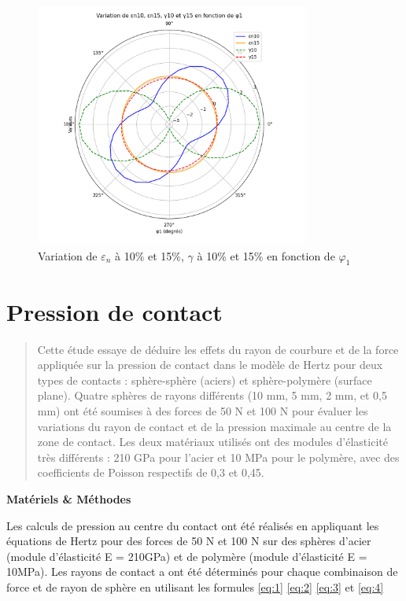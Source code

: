 \documentclass[a4paper,12pt]{article}
\begin{document}
\begin{figure}[H] 
	\centering
	\includegraphics[width=0.8\textwidth]{biop.png} 
	\caption{Variation de $\varepsilon_n$ à 10\% et 15\%, $\gamma$ à 10\% et 15\% en fonction de $\varphi_1$} 
	\label{fig:mon_image13} 
\end{figure}

\section{Pression de contact}

\begin{abstract}
	Cette étude essaye de déduire les effets du rayon de courbure et de la force appliquée sur la pression de contact dans le modèle de Hertz pour deux types de contacts : sphère-sphère (aciers) et sphère-polymère (surface plane). Quatre sphères de rayons différents (10 mm, 5 mm, 2 mm, et 0,5 mm) ont été soumises à des forces de 50 N et 100 N pour évaluer les variations du rayon de contact et de la pression maximale au centre de la zone de contact. Les deux matériaux utilisés ont des modules d'élasticité très différents : 210 GPa pour l'acier et 10 MPa pour le polymère, avec des coefficients de Poisson respectifs de 0,3 et 0,45.
\end{abstract}
\clearpage
\begin{center}
	\textbf{Matériels \& Méthodes}
\end{center}
Les calculs de pression au centre du contact ont été réalisés en appliquant les équations de Hertz pour des forces de 50 N et 100 N sur des sphères d'acier (module d'élasticité  E = 210GPa) et de polymère (module d'élasticité E = 10MPa). Les rayons de contact a ont été déterminés pour chaque combinaison de force et de rayon de sphère en utilisant les formules \eqref{eq:1} \eqref{eq:2} \eqref{eq:3} et \eqref{eq:4}
\end{document}
